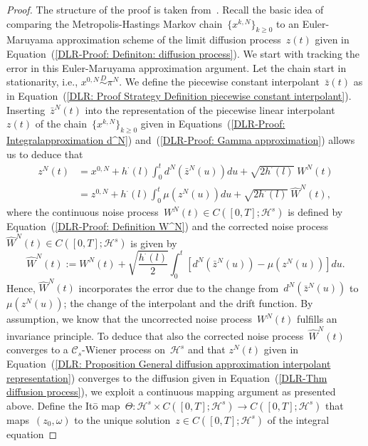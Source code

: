 \begin{proof}
  The structure of the proof is taken from~\autocite[Proposition 3.1]{Pillai2012}.  Recall the basic idea of comparing the Metropolis-Hastings Markov chain~$\{ x^{k,N} \}_{k \geq 0}$ to an Euler-Maruyama approximation scheme of the limit diffusion process~$z(t)$ given in Equation~(\ref{DLR-Proof: Definiton: diffusion process}). We start with tracking  the error in this Euler-Maruyama approximation argument. Let the chain start in stationarity, i.e., $x^{0,N} \stackrel{D}{\sim} \pi^N$. We define the piecewise constant interpolant~$\bar{z}(t)$ as in Equation~(\ref{DLR: Proof Strategy Definition piecewise constant interpolant}). Inserting~$\bar{z}^N(t)$ into the representation of the piecewise linear interpolant~$z(t)$ of the chain~$\{ x^{k,N} \}_{k \geq 0}$ given in Equations~(\ref{DLR-Proof: Integralapproximation d^N}) and~(\ref{DLR-Proof: Gamma approximation}) allows us to deduce that
  \begin{equation}
    \label{DLR: Proposition General diffusion approximation interpolant representation}
    \begin{split}
      z^N(t) & = x^{0,N} + h^{\cdot}(l) \int_0^t d^N(\bar{z}^N(u)) du + \sqrt{2 h^{\cdot}(l)} \; W^N(t) \\
      & = z^{0,N} + h^{\cdot}(l) \int_0^t \mu(z^N(u)) du + \sqrt{2 h^{\cdot}(l)} \;\widehat{W}^N(t),
    \end{split}
  \end{equation} 
  where the continuous noise process~$W^N(t) \in C([0,T]; \mathcal{H}^s)$ is defined by Equation~(\ref{DLR-Proof: Definition W^N}) and the corrected noise process~$\widehat{W}^N(t)\in C([0,T]; \mathcal{H}^s) $ is given by
  \begin{equation}
    \widehat{W}^N(t) :=  W^N(t) + \sqrt{\frac{h^{\cdot}(l)}{2}} \int_0^t [d^N(\bar{z}^N(u)) - \mu(z^N(u))] du.
  \end{equation}
  Hence, $\widehat{W}^N(t)$ incorporates the error due to the change from~$d^N(\bar{z}^N(u))$ to $\mu(z^N(u))$; the change of the interpolant and the drift function. By assumption, we know that the uncorrected noise process~$W^N(t)$ fulfills an invariance principle. To deduce that also the corrected noise process~$\widehat{W}^N(t)$ converges to a $\mathcal{C}_s$-Wiener process on~$\mathcal{H}^s$ and that $z^N(t)$ given in Equation~(\ref{DLR: Proposition General diffusion approximation interpolant representation}) converges to the diffusion given in Equation~(\ref{DLR-Thm diffusion process}), we exploit a continuous mapping argument as presented above. Define the It\={o} map~$\Theta : \mathcal{H}^s \times C([0,T]; \mathcal{H}^s) \to  C([0,T]; \mathcal{H}^s)$ that maps~$(z_0, \omega) $ to the unique solution~$z \in  C([0,T]; \mathcal{H}^s)$ of the integral equation

\end{proof}
